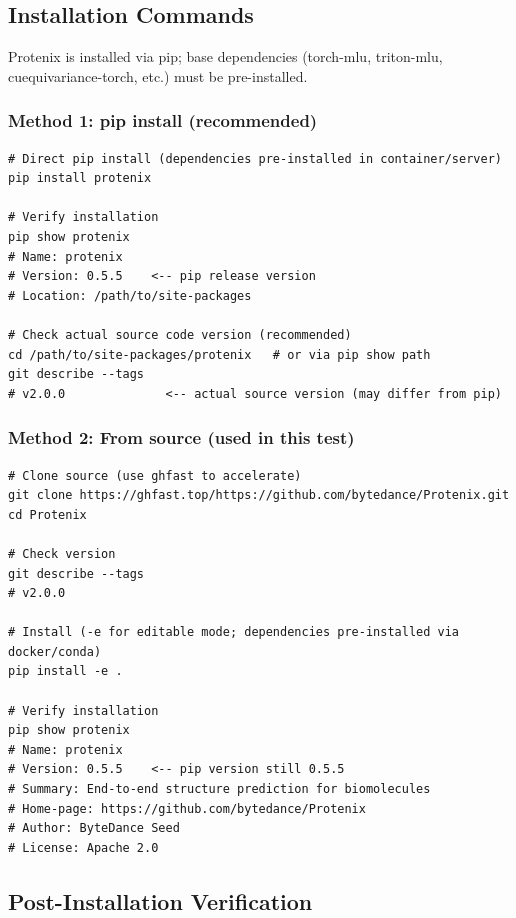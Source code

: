 \documentclass[12pt,a4paper]{article}
\begin{document}
\subsection{Installation Commands}

Protenix is installed via pip; base dependencies (torch-mlu, triton-mlu, cuequivariance-torch, etc.) must be pre-installed.

\subsubsection{Method 1: pip install (recommended)}

\begin{verbatim}
# Direct pip install (dependencies pre-installed in container/server)
pip install protenix

# Verify installation
pip show protenix
# Name: protenix
# Version: 0.5.5    <-- pip release version
# Location: /path/to/site-packages

# Check actual source code version (recommended)
cd /path/to/site-packages/protenix   # or via pip show path
git describe --tags
# v2.0.0              <-- actual source version (may differ from pip)
\end{verbatim}

\subsubsection{Method 2: From source (used in this test)}

\begin{verbatim}
# Clone source (use ghfast to accelerate)
git clone https://ghfast.top/https://github.com/bytedance/Protenix.git
cd Protenix

# Check version
git describe --tags
# v2.0.0

# Install (-e for editable mode; dependencies pre-installed via docker/conda)
pip install -e .

# Verify installation
pip show protenix
# Name: protenix
# Version: 0.5.5    <-- pip version still 0.5.5
# Summary: End-to-end structure prediction for biomolecules
# Home-page: https://github.com/bytedance/Protenix
# Author: ByteDance Seed
# License: Apache 2.0
\end{verbatim}

\subsection{Post-Installation Verification}
\end{document}
